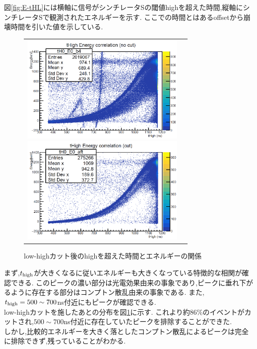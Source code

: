 図\ref{fig:E-tHL}には横軸に信号がシンチレータSの閾値highを超えた時間,縦軸にシンチレータSで観測されたエネルギーを示す.
ここでの時間とはあるoffsetから崩壊時間を引いた値を示している.
\begin{figure}[H]
	\begin{tabular}{cc}
		\begin{minipage}{0.5\hsize}
			\begin{center}
				\includegraphics[width=80mm]{fig/isb/E-tHL.pdf}
				\caption{閾値highを超えた時間とエネルギーの関係}
				\label{fig:E-tHL}
			\end{center}
		\end{minipage}
		\begin{minipage}{0.5\hsize}
			\begin{center}
				\includegraphics[width=80mm]{fig/isb/E-tHL_cut.pdf}
				\caption{low-highカット後のhighを超えた時間とエネルギーの関係}
				\label{fig:E-tHL_cut}
			\end{center}
		\end{minipage}
	\end{tabular}
\end{figure}
まず,$t_{\rm high}$が大きくなるに従いエネルギーも大きくなっている特徴的な相関が確認できる.
このピークの濃い部分は光電効果由来の事象であり,ピークに垂れ下がるように存在する部分はコンプトン散乱由来の事象である.
また,$t_{\rm high}=500\sim700$ns付近にもピークが確認できる.\\
low-highカットを施したあとの分布を図\ref{fig:E-tHL_cut}に示す.
これより約86\%のイベントがカットされ,$500\sim700$ns付近に存在していたピークを排除することができた.\\
しかし,比較的エネルギーを大きく落としたコンプトン散乱によるピークは完全に排除できず,残っていることがわかる.

